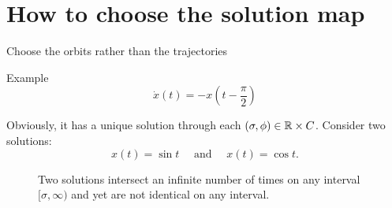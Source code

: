 
\begin{frame}[t]
  \tableofcontents
\end{frame}
\section{How to choose the solution map}
\begin{frame}[t]{Choose the orbits rather than the trajectories}
  \begin{exampleblock}{Example}
    \begin{equation}
      \dot{x}(t)=-x\left( t-\frac{\pi}{2} \right) 
    \end{equation}
  \end{exampleblock}
  Obviously, it has a unique solution through each $\left( \sigma,\phi \right) \in \mathbb{R}\times C$. 
  Consider two solutions:
  \begin{equation}\label{eqn-2}
    x(t)=\sin t \quad\text{ and }\quad x(t)=\cos t.
  \end{equation}
  \begin{figure}
    \centering
\label{fig-1}
\caption{Two solutions intersect an infinite number of times on any interval $[\sigma,\infty)$ and yet are not identical on any interval.}
\end{figure}
\end{frame}
